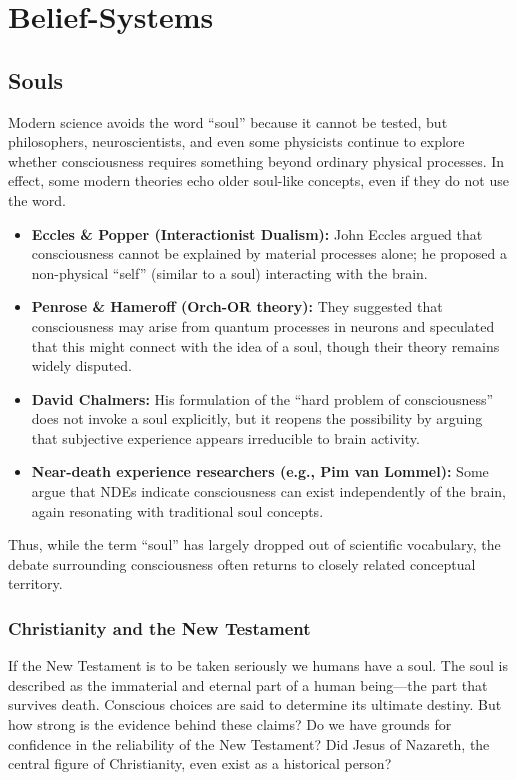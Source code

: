 \chapter{Belief-Systems}
\label{chap:belief-systems}

\section{Souls}

Modern science avoids the word ``soul'' because it cannot be tested, but philosophers, neuroscientists, and even some physicists continue to explore whether consciousness requires something beyond ordinary physical processes. In effect, some modern theories echo older soul-like concepts, even if they do not use the word.

\begin{itemize}
  \item \textbf{Eccles \& Popper (Interactionist Dualism):} John Eccles argued that consciousness cannot be explained by material processes alone; he proposed a non-physical ``self'' (similar to a soul) interacting with the brain.
  \item \textbf{Penrose \& Hameroff (Orch-OR theory):} They suggested that consciousness may arise from quantum processes in neurons and speculated that this might connect with the idea of a soul, though their theory remains widely disputed.
  \item \textbf{David Chalmers:} His formulation of the ``hard problem of consciousness'' does not invoke a soul explicitly, but it reopens the possibility by arguing that subjective experience appears irreducible to brain activity.
  \item \textbf{Near-death experience researchers (e.g., Pim van Lommel):} Some argue that NDEs indicate consciousness can exist independently of the brain, again resonating with traditional soul concepts.
\end{itemize}

Thus, while the term ``soul'' has largely dropped out of scientific vocabulary, the debate surrounding consciousness often returns to closely related conceptual territory.

\subsection*{Christianity and the New Testament}

If the New Testament is to be taken seriously we humans have a soul. The soul is described as the immaterial and eternal part of a human being—the part that survives death.
Conscious choices are said to determine its ultimate destiny. But how strong is the evidence behind these claims? Do we have grounds for confidence in the reliability of the New Testament? Did Jesus of Nazareth, the central figure of Christianity, even exist as a historical person?

